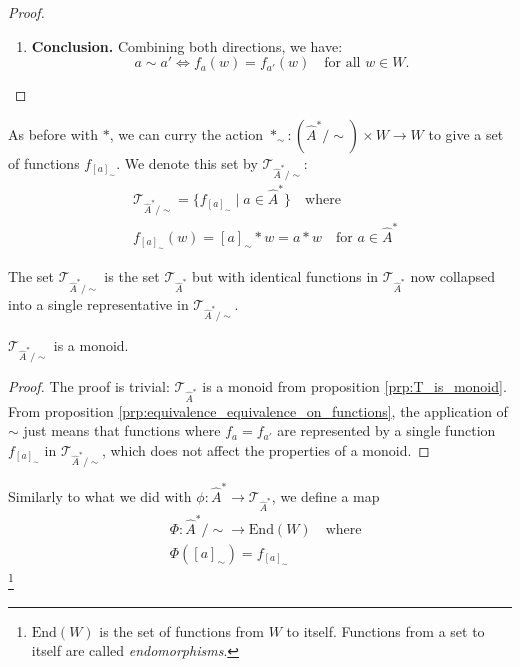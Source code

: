 \begin{proof}
\begin{enumerate}[(1)]
        \item \textbf{Conclusion.}
              Combining both directions, we have:
              \begin{equation}
                  a \sim a' \iff f_{a}(w) = f_{a'}(w) \quad \text{for all } w \in W.
              \end{equation}
    \end{enumerate}
\end{proof}


As before with $\ast$, we can curry the action $\ast_{\sim}: (\hat{A}^{\ast}/\sim) \times W \to W$ to give a set of functions $f_{[a]_{\sim}}$.
We denote this set by $\mathcal{T}_{\hat{A}^{\ast}/\sim}$:
\begin{equation}
    \begin{aligned}
         & \mathcal{T}_{\hat{A}^{\ast}/\sim} = \{ f_{[a]_{\sim}} \mid a \in \hat{A}^{\ast} \} \quad \text{where} \\
         & f_{[a]_{\sim}}(w) = [a]_{\sim} \ast w = a \ast w \quad \text{for $a \in \hat{A}^{\ast}$}
    \end{aligned}
\end{equation}

The set $\mathcal{T}_{\hat{A}^{\ast}/\sim}$ is the set $\mathcal{T}_{\hat{A}^{\ast}}$ but with identical functions in $\mathcal{T}_{\hat{A}^{\ast}}$ now collapsed into a single representative in $\mathcal{T}_{\hat{A}^{\ast}/\sim}$.

\begin{proposition}
    $\mathcal{T}_{\hat{A}^{\ast}/\sim}$ is a monoid.
\end{proposition}
\begin{proof}
    The proof is trivial: $\mathcal{T}_{\hat{A}^{\ast}}$ is a monoid from proposition \ref{prp:T_is_monoid}.
    From proposition \ref{prp:equivalence_equivalence_on_functions}, the application of $\sim$ just means that functions where $f_{a}=f_{a'}$ are represented by a single function $f_{[a]_{\sim}}$ in $\mathcal{T}_{\hat{A}^{\ast}/\sim}$, which does not affect the properties of a monoid.
\end{proof}

Similarly to what we did with $\phi: \hat{A}^{\ast} \to \mathcal{T}_{\hat{A}^{\ast}}$, we define a map
\begin{equation}
    \begin{aligned}
         & \Phi : \hat{A}^{\ast}/\sim \to \text{End}(W) \quad \text{where} \\
         & \Phi([a]_{\sim}) = f_{[a]_{\sim}}
    \end{aligned}
\end{equation}
\footnote{$\text{End}(W)$ is the set of functions from $W$ to itself.
    Functions from a set to itself are called \emph{endomorphisms}.}

